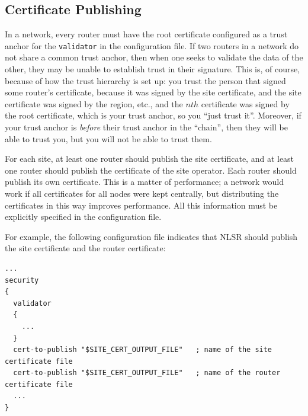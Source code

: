 \subsection{Certificate Publishing}

In a network, every router must have the root certificate configured as a trust anchor for the \texttt{validator} in the configuration file. If two routers in a network do not share a common trust anchor, then when one seeks to validate the data of the other, they may be unable to establish trust in their signature. This is, of course, because of how the trust hierarchy is set up: you trust the person that signed some router's certificate, because it was signed by the site certificate, and the site certificate was signed by the region, etc., and the $nth$ certificate was signed by the root certificate, which is your trust anchor, so you ``just trust it''. Moreover, if your trust anchor is \emph{before} their trust anchor in the ``chain'', then they will be able to trust you, but you will not be able to trust them.

For each site, at least one router should publish the site certificate, and at least one router should publish the certificate of the site operator.
Each router should publish its own certificate. This is a matter of performance; a network would work if all certificates for all nodes were kept centrally, but distributing the certificates in this way improves performance.
All this information must be explicitly specified in the configuration file.

For example, the following configuration file indicates that NLSR should publish the site certificate and the router certificate:

\begin{verbatim}
...
security
{
  validator
  {
    ...
  }
  cert-to-publish "$SITE_CERT_OUTPUT_FILE"   ; name of the site certificate file
  cert-to-publish "$SITE_CERT_OUTPUT_FILE"   ; name of the router certificate file
  ...
}
\end{verbatim}
